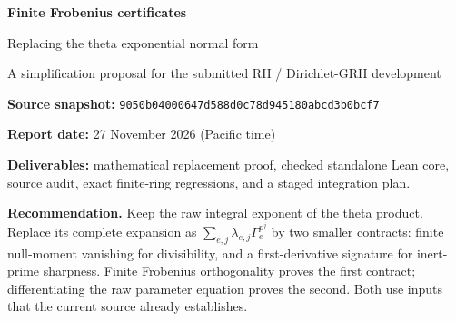 \documentclass[11pt,letterpaper]{article}
\theoremstyle{remark}
\newcommand{\code}[1]{{\small\nolinkurl{#1}}}
\begin{document}
\thispagestyle{empty}
{\color{ink}\sffamily\bfseries\LARGE Finite Frobenius certificates\par}
\vspace{3pt}
{\color{ink}\sffamily\Large Replacing the theta exponential normal form\par}
\vspace{8pt}
{\large A simplification proposal for the submitted RH / Dirichlet-GRH development}

\vspace{7pt}
\textbf{Source snapshot:} \code{9050b04000647d588d0c78d945180abcd3b0bcf7}\par
\textbf{Report date:} 27 November 2026 (Pacific time)\par
\textbf{Deliverables:} mathematical replacement proof, checked standalone Lean core,
source audit, exact finite-ring regressions, and a staged integration plan.

\vspace{8pt}
\colorbox{pale}{\parbox{\dimexpr\linewidth-2\fboxsep\relax}{
\textbf{Recommendation.} Keep the raw integral exponent of the theta product.
Replace its complete expansion as
\(\sum_{e,j}\lambda_{e,j}\Gamma_e^{p^j}\)
by two smaller contracts: finite null-moment vanishing for divisibility, and a
first-derivative signature for inert-prime sharpness. Finite Frobenius orthogonality
proves the first contract; differentiating the raw parameter equation proves the
second. Both use inputs that the current source already establishes.
}}

\begin{abstract}
The current local argument determines an infinite, two-index coupling expansion,
turns it into an exact exponential normal form, and then uses only selected
consequences of that normal form. The replacement developed here avoids this
intermediate classification. In a finite jet algebra, Frobenius is nilpotent on
the augmentation ideal. The scaled formal-parameter equation can therefore be
inverted by a finite geometric sum. A weighted pairing of two Frobenius iterates
is a Frobenius iterate of a single moment. Even and odd iterates are consequently
orthogonal when the inert coupling moments vanish; the ramified case uses all
moments, including degree two. Differentiating the raw exponent separately recovers
the same pure-power gradient and unit leading coefficients used for sharpness.

The replacement preserves the existing local valuation bounds and their global
error budgets. It targets 752 physical lines in four source files, with another
84 helper lines subject to a dependency audit. These are affected regions, not
measured net deletions. A 314-line independent Lean file checks the finite algebraic
core against the repository's exact Lean and mathlib versions. The formal-group
adapters and full-project refactor remain to be implemented. The proposal is
distinct from the mechanisms and stated future directions in the 18 existing
proposal directories at the pinned commit.
\end{abstract}
\end{document}
